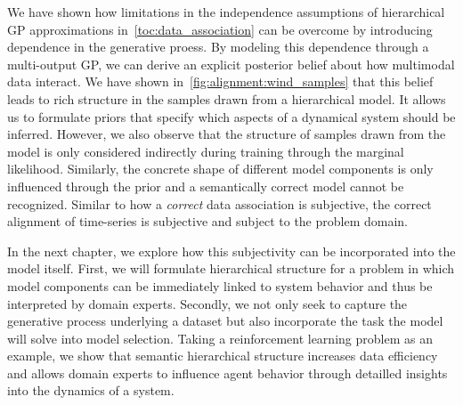 We have shown how limitations in the independence assumptions of hierarchical GP approximations in~\cref{toc:data_association} can be overcome by introducing dependence in the generative proess.
By modeling this dependence through a multi-output GP, we can derive an explicit posterior belief about how multimodal data interact.
We have shown in~\cref{fig:alignment:wind_samples} that this belief leads to rich structure in the samples drawn from a hierarchical model.
It allows us to formulate priors that specify which aspects of a dynamical system should be inferred.
However, we also observe that the structure of samples drawn from the model is only considered indirectly during training through the marginal likelihood.
Similarly, the concrete shape of different model components is only influenced through the prior and a semantically correct model cannot be recognized.
Similar to how a \emph{correct} data association is subjective, the correct alignment of time-series is subjective and subject to the problem domain.

In the next chapter, we explore how this subjectivity can be incorporated into the model itself.
First, we will formulate hierarchical structure for a problem in which model components can be immediately linked to system behavior and thus be interpreted by domain experts.
Secondly, we not only seek to capture the generative process underlying a dataset but also incorporate the task the model will solve into model selection.
Taking a reinforcement learning problem as an example, we show that semantic hierarchical structure increases data efficiency and allows domain experts to influence agent behavior through detailled insights into the dynamics of a system.
